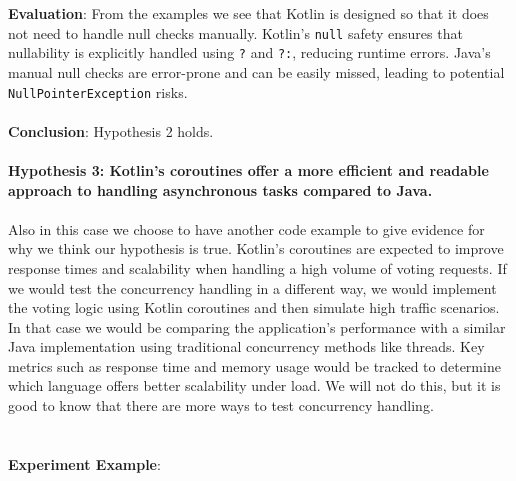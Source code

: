 \noindent \textbf{Evaluation}: From the examples we see that Kotlin is designed so that it does not need to handle null checks manually. Kotlin’s \texttt{null} safety ensures that nullability is explicitly handled using \texttt{?} and \texttt{?:}, reducing runtime errors. Java’s manual null checks are error-prone and can be easily missed, leading to potential \texttt{NullPointerException} risks.
\\
\\
\textbf{Conclusion}: Hypothesis 2 holds.
\\
\\
\textbf{Hypothesis 3: Kotlin's coroutines offer a more efficient and readable approach to handling asynchronous tasks compared to Java.}
\\
\\ 
Also in this case we choose to have another code example to give evidence for why we think our hypothesis is true. Kotlin's coroutines are expected to improve response times and scalability when handling a high volume of voting requests.  If we would test the concurrency handling in a different way, we would implement the voting logic using Kotlin coroutines and then simulate high traffic scenarios. In that case we would be comparing the application’s performance with a similar Java implementation using traditional concurrency methods like threads. Key metrics such as response time and memory usage would be tracked to determine which language offers better scalability under load. We will not do this, but it is good to know that there are more ways to test concurrency handling.
\\
\\
\\
\textbf{Experiment Example}:
